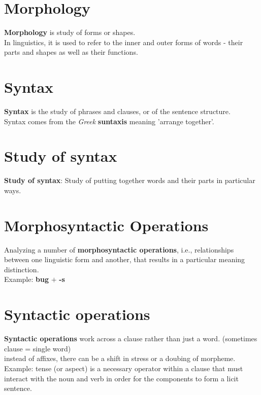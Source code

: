 \section{Morphology}\label{Language: Morphology}
\textbf{Morphology} is study of forms or shapes.\\
In linguistics, it is used to refer to the inner and outer forms of words - their parts and shapes as well as their functions.



\section{Syntax}\label{Language: Syntax}
    \textbf{Syntax} is the study of phrases and clauses, or of the sentence structure.\\ Syntax comes from the \textit{Greek} \textbf{suntaxis} meaning 'arrange together'.

\section{Study of syntax}\label{Language: Study of syntax}
    \textbf{Study of syntax}: Study of putting together words and their parts in particular ways.

\section{Morphosyntactic Operations} \label{morphosyntactic operations}
    Analyzing a number of \textbf{morphosyntactic operations}, i.e., relationships between one linguistic form and another, that results in a particular meaning distinction. \\ Example: \textbf{bug} $+$ \textbf{-s}
        

\section{Syntactic operations}\label{Syntactic operations}
    \item \textbf{Syntactic operations} work across a clause rather than just a word. (sometimes clause = single word)\\
    instead of affixes, there can be a shift in stress or a doubing of morpheme.\\
    Example: tense (or aspect)  is a necessary operator within a clause that must interact with the noun and verb in order for the components to form a licit sentence.


